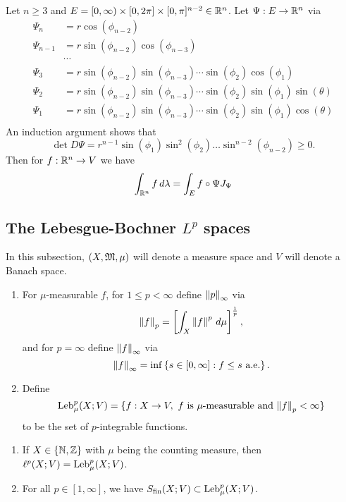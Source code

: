 \documentclass[a4paper]{article}
\begin{document}
\begin{eg}
Let $n \geq 3$ and $E = [0, \infty) \times [0, 2 \pi]
\times [0, \pi]^{n-2} \in \mathbb{R}^n$. Let $\Psi: E \to \mathbb{R}^n$
via
\[
\begin{aligned}
\Psi_n &= r \cos (\phi_{n-2}) \\
\Psi_{n-1} &= r \sin (\phi_{n-2}) \cos (\phi_{n-3}) \\
&\cdots \\
\Psi_3 &= r \sin (\phi_{n-2}) \sin (\phi_{n-3}) \cdots \sin (\phi_2)
\cos (\phi_1) \\
\Psi_2 &= r \sin (\phi_{n-2}) \sin (\phi_{n-3}) \cdots \sin (\phi_2)
\sin (\phi_1) \sin (\theta) \\
\Psi_1 &= r \sin (\phi_{n-2}) \sin (\phi_{n-3}) \cdots \sin (\phi_2)
\sin (\phi_1) \cos (\theta) \\
\end{aligned}
\]
An induction argument shows that
\[
\det D\Psi = r^{n-1} \sin (\phi_1) \sin^2 (\phi_2)
\dots \sin^{n-2} (\phi_{n-2}) \geq 0.
\]
Then for $f : \mathbb{R}^n \to V$ we have
\[
\int_{\mathbb{R}^n} f \, d \lambda = \int_E f \circ \Psi J_{\Psi}
\]
\end{eg}

\subsection{The Lebesgue-Bochner $L^p$ spaces}

In this subsection, $(X, \mathfrak{M}, \mu)$ will denote a measure
space and $V$ will denote a Banach space.

\begin{defi}
\begin{enumerate}
\item For $\mu$-measurable $f$, for $1 \leq p < \infty$
define $\left\lVert p\right\rVert_\infty$ via
\[
\left\lVert f\right\rVert_p = \left[ \int_X \left\lVert f\right\rVert^p \, d \mu \right]^{\frac{1}{p}},
\]
and for $p = \infty$ define $\left\lVert f\right\rVert_\infty$ via
\[
\left\lVert f\right\rVert_\infty = \inf \left\{ s \in [0, \infty] : f
\leq s \text{ a.e.} \right\}.
\]

\item Define
\[
\operatorname{Leb}_\mu^p (X; V) = \{ f : X \to V, \text{ $f$ is $\mu$-measurable
and $\left\lVert f\right\rVert_p < \infty$} \}
\]
to be the set of $p$-integrable functions.
\end{enumerate}
\end{defi}

\begin{eg}
\begin{enumerate}
\item If $X \in \{\mathbb{N}, \mathbb{Z}\}$ with $\mu$ being the counting
measure, then $\ell^p(X; V) = \operatorname{Leb}_\mu^p (X; V)$.

\item For all $p \in [1, \infty]$, we have
$S_{\text{fin}}(X; V) \subset \operatorname{Leb}_\mu^p (X; V)$.
\end{enumerate}
\end{eg}
\end{document}

